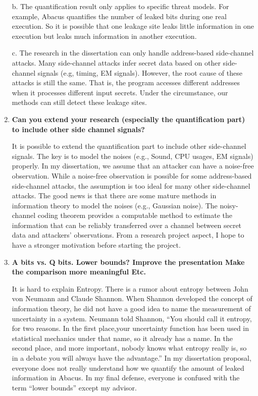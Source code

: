 \documentclass{article}
\begin{document}
\begin{enumerate}
b. The quantification result only applies to specific threat models. For example, Abacus quantifies the number of leaked bits during one real execution. So it is possible that one leakage site leaks little information in one execution but leaks much information in another execution.

c. The research in the dissertation can only handle address-based side-channel attacks. Many side-channel attacks infer secret data based on other side-channel signals (e.g, timing, EM signals). However, the root cause of these attacks is still the same. That is, the program accesses different addresses when it processes different input secrets. Under the circumstance, our methods can still detect these leakage sites.

\item \textbf{Can you extend your research (especially the quantification part) to include other side channel signals?}

It is possible to extend the quantification part to include other side-channel signals. The key is to model the noises (e.g., Sound, CPU usages, EM signals) properly. In my dissertation, we assume that an attacker can have a noise-free observation. While a noise-free observation is possible for some address-based side-channel attacks, the assumption is too ideal for many other side-channel attacks. The good news is that there are some mature methods in information theory to model the noises (e.g., Gaussian noise). The noisy-channel coding theorem provides a computable method to estimate the information that can be reliably transferred over a channel between secret data and attackers' observations. From a research project aspect, I hope to have a stronger motivation before starting the project. 
\item \textbf{A bits vs. Q bits. Lower bounds?
       Improve the presentation
       Make the comparison more meaningful
       Etc.}

It is hard to explain Entropy. There is a rumor about entropy between John von Neumann and Claude Shannon. When Shannon developed the concept of information theory, he did not have a good idea to name the measurement of uncertainty in a system. Neumann told Shannon, ``You should call it entropy, for two reasons. In the first place,your uncertainty function has been used in statistical mechanics under that name, so it already has a name. In the second place, and more important, nobody knows what entropy really is, so in a debate you will always have the advantage.'' In my dissertation proposal, everyone does not really understand how we quantify the amount of leaked information in Abacus. In my final defense, everyone is confused with the term ``lower bounds'' except my advisor. 


\end{enumerate}
\end{document}
